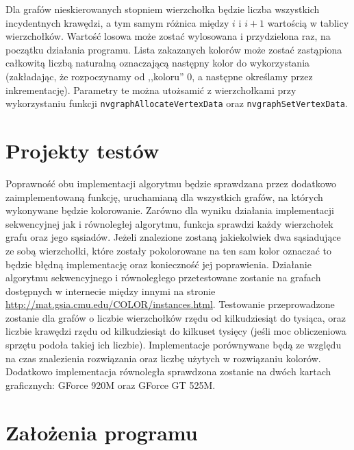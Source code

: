 \documentclass{article}
\begin{document}
	Dla grafów nieskierowanych stopniem wierzchołka będzie liczba wszystkich incydentnych krawędzi, a tym samym różnica między $i$ i $i+1$ wartością w tablicy wierzchołków. Wartość losowa może zostać wylosowana i przydzielona raz, na początku działania programu. Lista zakazanych kolorów może zostać zastąpiona całkowitą liczbą naturalną oznaczającą następny kolor do wykorzystania (zakładając, że rozpoczynamy od ,,koloru'' 0, a następne określamy przez inkrementację). Parametry te można utożsamić z wierzchołkami przy wykorzystaniu funkcji \texttt{nvgraphAllocateVertexData} oraz \texttt{nvgraphSetVertexData}.
	
	\section{Projekty testów}
	Poprawność obu implementacji algorytmu będzie sprawdzana przez dodatkowo zaimplementowaną funkcję, uruchamianą dla wszystkich grafów, na których wykonywane będzie kolorowanie. Zarówno dla wyniku działania implementacji sekwencyjnej jak i równoległej algorytmu, funkcja sprawdzi każdy wierzchołek grafu oraz jego sąsiadów. Jeżeli znalezione zostaną jakiekolwiek dwa sąsiadujące ze sobą wierzchołki, które zostały pokolorowane na ten sam kolor oznaczać to będzie błędną implementację oraz konieczność jej poprawienia. Działanie algorytmu sekwencyjnego i równoległego przetestowane zostanie na grafach dostępnych w internecie między innymi na stronie \url{http://mat.gsia.cmu.edu/COLOR/instances.html}. Testowanie przeprowadzone zostanie dla grafów o liczbie wierzchołków rzędu od kilkudziesiąt do tysiąca, oraz liczbie krawędzi rzędu od kilkudziesiąt do kilkuset tysięcy (jeśli moc obliczeniowa sprzętu podoła takiej ich liczbie). Implementacje porównywane będą ze względu na czas znalezienia rozwiązania oraz liczbę użytych w rozwiązaniu kolorów. Dodatkowo implementacja równoległa sprawdzona zostanie na dwóch kartach graficznych: GForce 920M oraz GForce GT 525M.
	\section{Założenia programu}
	
	

 


\end{document}

